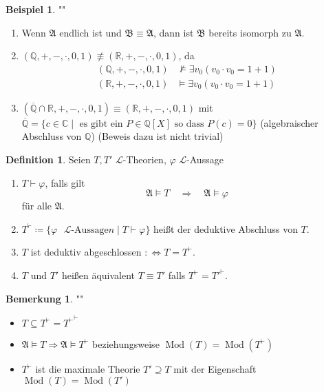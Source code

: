 \documentclass[12pt,parskip=full]{scrartcl}
\newcommand{\setQ}{\mathbb{Q}}
\newcommand{\setR}{\mathbb{R}}
\newcommand{\setC}{\mathbb{C}}
\theoremstyle{definition}
\newtheorem{definition}[theorem]{Definition}
\newtheorem{example}[theorem]{Beispiel}
\newtheorem{remark}[theorem]{Bemerkung}
\begin{document}
	\begin{example}""
		\begin{enumerate}
			\item Wenn $\mathfrak{A}$ endlich ist und $\mathfrak{B} \equiv \mathfrak{A}$, dann ist $\mathfrak{B}$ bereits isomorph zu $\mathfrak{A}$.
			\item $(\setQ, +, -, \cdot, 0, 1) \not\equiv (\setR, +, - , \cdot, 0, 1)$, da
			\begin{align*}
				(\setQ, +, -, \cdot, 0, 1) &\not\models \exists v_0 (v_0 \cdot v_0 = 1 + 1) \\(\setR, +, -, \cdot, 0, 1) &\models \exists v_0 (v_0 \cdot v_0 = 1 + 1)
			\end{align*}
			\item $(\overline{\setQ} \cap \setR, +, -, \cdot, 0, 1) \equiv (\setR, +, -, \cdot, 0, 1)$ mit $\overline{\setQ} = \{ c \in \setC \mid \text{ es gibt ein $P \in \setQ[X]$ so dass $P(c) = 0$} \}$ (algebraischer Abschluss von $\setQ$) (Beweis dazu ist nicht trivial)
		\end{enumerate}
	\end{example}

	\begin{definition}
		Seien $T, T'$ $\mathcal{L}$-Theorien, $\varphi$ $\mathcal{L}$-Aussage
		\begin{enumerate}
			\item $T \vdash \varphi$, falls gilt
			\begin{equation*}
				\mathfrak{A} \models T \quad\Longrightarrow\quad \mathfrak{A} \models \varphi
			\end{equation*}
			für alle $\mathfrak{A}$.
			\item $T^\vdash \coloneqq \{ \varphi \text{ $\mathcal{L}$-Aussage}n \mid T \vdash \varphi \}$ heißt der deduktive Abschluss von $T$.
			\item $T$ ist deduktiv abgeschlossen $:\Leftrightarrow T = T^\vdash$.
			\item $T$ und $T'$ heißen äquivalent $T \equiv T'$ falls $T^\vdash = T'^\vdash$.
		\end{enumerate}
	\end{definition}

	\begin{remark}""
		\begin{itemize}
			\item $T \subseteq T^\vdash = {T^\vdash}^\vdash$
			\item $\mathfrak{A} \models T \Rightarrow \mathfrak{A} \models T^\vdash$ beziehungsweise $\operatorname{Mod}(T) = \operatorname{Mod}(T^\vdash)$
			\item $T^\vdash$ ist die maximale Theorie $T' \supseteq T$ mit der Eigenschaft $\operatorname{Mod}(T) = \operatorname{Mod}(T')$
		\end{itemize}
	\end{remark}
\end{document}
